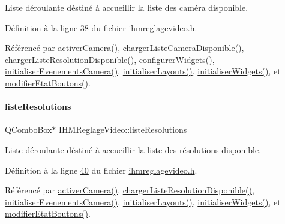 Liste déroulante déstiné à accueillir la liste des caméra disponible. 



Définition à la ligne \hyperlink{ihmreglagevideo_8h_source_l00038}{38} du fichier \hyperlink{ihmreglagevideo_8h_source}{ihmreglagevideo.\+h}.



Référencé par \hyperlink{ihmreglagevideo_8cpp_source_l00203}{activer\+Camera()}, \hyperlink{ihmreglagevideo_8cpp_source_l00132}{charger\+Liste\+Camera\+Disponible()}, \hyperlink{ihmreglagevideo_8cpp_source_l00172}{charger\+Liste\+Resolution\+Disponible()}, \hyperlink{ihmreglagevideo_8cpp_source_l00047}{configurer\+Widgets()}, \hyperlink{ihmreglagevideo_8cpp_source_l00117}{initialiser\+Evenements\+Camera()}, \hyperlink{ihmreglagevideo_8cpp_source_l00061}{initialiser\+Layouts()}, \hyperlink{ihmreglagevideo_8cpp_source_l00023}{initialiser\+Widgets()}, et \hyperlink{ihmreglagevideo_8cpp_source_l00212}{modifier\+Etat\+Boutons()}.

\mbox{\label{class_i_h_m_reglage_video_ad897355a4350d95f5f219db57ff68d4f}} 
\paragraph{\texorpdfstring{liste\+Resolutions}{listeResolutions}}
{\footnotesize\ttfamily Q\+Combo\+Box$\ast$ I\+H\+M\+Reglage\+Video\+::liste\+Resolutions\hspace{0.3cm}{\ttfamily [private]}}



Liste déroulante déstiné à accueillir la liste des résolutions disponible. 



Définition à la ligne \hyperlink{ihmreglagevideo_8h_source_l00040}{40} du fichier \hyperlink{ihmreglagevideo_8h_source}{ihmreglagevideo.\+h}.



Référencé par \hyperlink{ihmreglagevideo_8cpp_source_l00203}{activer\+Camera()}, \hyperlink{ihmreglagevideo_8cpp_source_l00179}{charger\+Liste\+Resolution\+Disponible()}, \hyperlink{ihmreglagevideo_8cpp_source_l00117}{initialiser\+Evenements\+Camera()}, \hyperlink{ihmreglagevideo_8cpp_source_l00061}{initialiser\+Layouts()}, \hyperlink{ihmreglagevideo_8cpp_source_l00023}{initialiser\+Widgets()}, et \hyperlink{ihmreglagevideo_8cpp_source_l00212}{modifier\+Etat\+Boutons()}.

